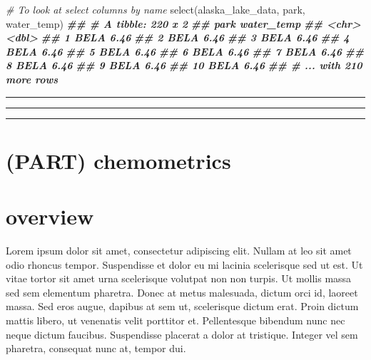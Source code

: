 \documentclass[
]{krantz}
\newenvironment{Shaded}{\begin{snugshade}}{\end{snugshade}}
\newcommand{\CommentTok}[1]{\textcolor[rgb]{0.56,0.35,0.01}{\textit{#1}}}
\newcommand{\DocumentationTok}[1]{\textcolor[rgb]{0.56,0.35,0.01}{\textbf{\textit{#1}}}}
\newcommand{\FunctionTok}[1]{\textcolor[rgb]{0.00,0.00,0.00}{#1}}
\newcommand{\NormalTok}[1]{#1}
\begin{document}
\begin{Shaded}
\begin{Highlighting}[]
\CommentTok{\# To look at select columns by name}
\FunctionTok{select}\NormalTok{(alaska\_lake\_data, park, water\_temp)}
\DocumentationTok{\#\# \# A tibble: 220 x 2}
\DocumentationTok{\#\#    park  water\_temp}
\DocumentationTok{\#\#    \textless{}chr\textgreater{}      \textless{}dbl\textgreater{}}
\DocumentationTok{\#\#  1 BELA        6.46}
\DocumentationTok{\#\#  2 BELA        6.46}
\DocumentationTok{\#\#  3 BELA        6.46}
\DocumentationTok{\#\#  4 BELA        6.46}
\DocumentationTok{\#\#  5 BELA        6.46}
\DocumentationTok{\#\#  6 BELA        6.46}
\DocumentationTok{\#\#  7 BELA        6.46}
\DocumentationTok{\#\#  8 BELA        6.46}
\DocumentationTok{\#\#  9 BELA        6.46}
\DocumentationTok{\#\# 10 BELA        6.46}
\DocumentationTok{\#\# \# ... with 210 more rows}
\end{Highlighting}
\end{Shaded}

\begin{center}\rule{0.5\linewidth}{0.5pt}\end{center}

\begin{center}\rule{0.5\linewidth}{0.5pt}\end{center}

\begin{center}\rule{0.5\linewidth}{0.5pt}\end{center}

\hypertarget{part-chemometrics}{%
\section{(PART) chemometrics}\label{part-chemometrics}}

\hypertarget{overview}{%
\section*{overview}\label{overview}}

Lorem ipsum dolor sit amet, consectetur adipiscing elit. Nullam at leo sit amet odio rhoncus tempor. Suspendisse et dolor eu mi lacinia scelerisque sed ut est. Ut vitae tortor sit amet urna scelerisque volutpat non non turpis. Ut mollis massa sed sem elementum pharetra. Donec at metus malesuada, dictum orci id, laoreet massa. Sed eros augue, dapibus at sem ut, scelerisque dictum erat. Proin dictum mattis libero, ut venenatis velit porttitor et. Pellentesque bibendum nunc nec neque dictum faucibus. Suspendisse placerat a dolor at tristique. Integer vel sem pharetra, consequat nunc at, tempor dui.
\end{document}
